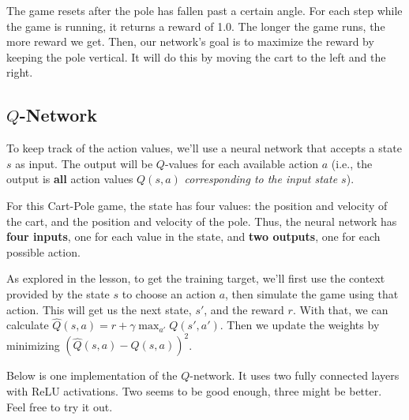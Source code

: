 \documentclass[11pt]{article}
\begin{document}
    The game resets after the pole has fallen past a certain angle. For each
step while the game is running, it returns a reward of 1.0. The longer
the game runs, the more reward we get. Then, our network's goal is to
maximize the reward by keeping the pole vertical. It will do this by
moving the cart to the left and the right.

\subsection{\texorpdfstring{\(Q\)-Network}{Q-Network}}\label{q-network}

To keep track of the action values, we'll use a neural network that
accepts a state \(s\) as input. The output will be \(Q\)-values for each
available action \(a\) (i.e., the output is \textbf{all} action values
\(Q(s,a)\) \emph{corresponding to the input state \(s\)}).

For this Cart-Pole game, the state has four values: the position and
velocity of the cart, and the position and velocity of the pole. Thus,
the neural network has \textbf{four inputs}, one for each value in the
state, and \textbf{two outputs}, one for each possible action.

As explored in the lesson, to get the training target, we'll first use
the context provided by the state \(s\) to choose an action \(a\), then
simulate the game using that action. This will get us the next state,
\(s'\), and the reward \(r\). With that, we can calculate
\(\hat{Q}(s,a) = r + \gamma \max_{a'}{Q(s', a')}\). Then we update the
weights by minimizing \((\hat{Q}(s,a) - Q(s,a))^2\).

Below is one implementation of the \(Q\)-network. It uses two fully
connected layers with ReLU activations. Two seems to be good enough,
three might be better. Feel free to try it out.
\end{document}
